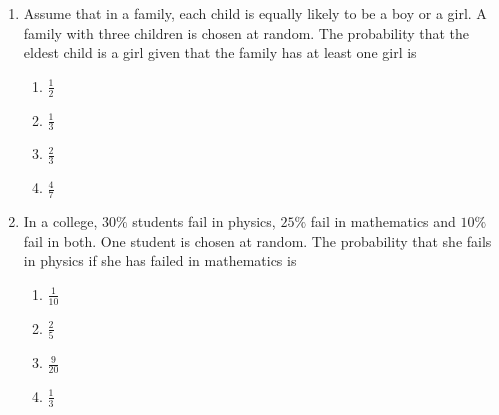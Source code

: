 \begin{enumerate}[label=\thesubsection.\arabic*,ref=\thesubsection.\theenumi]
%
\item Assume that in a family, each child is equally likely to be a boy or a girl. A family with three children is chosen at random. The probability that the eldest child is a girl given that the family has at least one girl is
\begin{enumerate}
\item $\frac{1}{2}$
\item $\frac{1}{3}$
\item $\frac{2}{3}$
\item $\frac{4}{7}$
\end{enumerate}
%
\item In a college, $30\%$ students fail in physics, $25\%$ fail in mathematics and $10\%$ fail in both. One student is chosen at random. The probability that she fails in physics if she has failed in mathematics is
\begin{enumerate}
    \item $\frac{1}{10}$
    \item $\frac{2}{5}$
    \item $\frac{9}{20}$
    \item $\frac{1}{3}$
\end{enumerate}
%
\end{enumerate}
